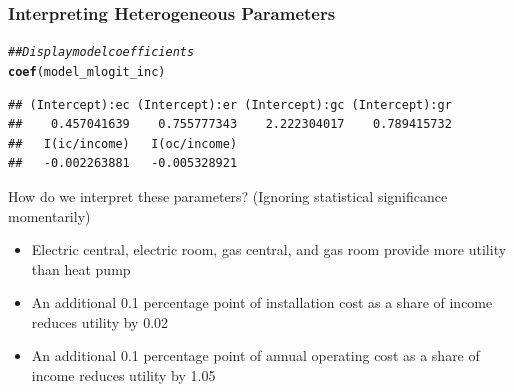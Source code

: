 \documentclass{beamer}\usepackage[]{graphicx}\usepackage[]{xcolor}
\makeatletter
\newcommand{\hlstr}[1]{\textcolor[rgb]{0.192,0.494,0.8}{#1}}%
\newcommand{\hlcom}[1]{\textcolor[rgb]{0.678,0.584,0.686}{\textit{#1}}}%
\newcommand{\hlopt}[1]{\textcolor[rgb]{0,0,0}{#1}}%
\newcommand{\hlstd}[1]{\textcolor[rgb]{0.345,0.345,0.345}{#1}}%
\newcommand{\hlkwc}[1]{\textcolor[rgb]{0.333,0.667,0.333}{#1}}%
\newcommand{\hlkwd}[1]{\textcolor[rgb]{0.737,0.353,0.396}{\textbf{#1}}}%
\newenvironment{kframe}{%
 \def\at@end@of@kframe{}%
 \ifinner\ifhmode%
  \def\at@end@of@kframe{\end{minipage}}%
  \begin{minipage}{\columnwidth}%
 \fi\fi%
 \def\FrameCommand##1{\hskip\@totalleftmargin \hskip-\fboxsep
 \colorbox{shadecolor}{##1}\hskip-\fboxsep
     \hskip-\linewidth \hskip-\@totalleftmargin \hskip\columnwidth}%
 \MakeFramed {\advance\hsize-\width
   \@totalleftmargin\z@ \linewidth\hsize
   \@setminipage}}%
 {\par\unskip\endMakeFramed%
 \at@end@of@kframe}
\newenvironment{knitrout}{}{} %
\makeatother
\begin{document}
\begin{frame}[fragile]\frametitle{Interpreting Heterogeneous Parameters}
\begin{knitrout}\footnotesize
{}\color{fgcolor}\begin{kframe}
\begin{alltt}
\hlcom{## Display model coefficients}
\hlkwd{coef}\hlstd{(model_mlogit_inc)}
\end{alltt}
\begin{verbatim}
## (Intercept):ec (Intercept):er (Intercept):gc (Intercept):gr 
##    0.457041639    0.755777343    2.222304017    0.789415732 
##   I(ic/income)   I(oc/income) 
##   -0.002263881   -0.005328921
\end{verbatim}
\end{kframe}
\end{knitrout}
    \vspace{2ex}
    How do we interpret these parameters? (Ignoring statistical significance momentarily)
    \begin{itemize}
        \item Electric central, electric room, gas central, and gas room provide more utility than heat pump
        \item An additional 0.1 percentage point of installation cost as a share of income reduces utility by 0.02
        \item An additional 0.1 percentage point of annual operating cost as a share of income reduces utility by 1.05
    \end{itemize}
\end{frame}

\end{document}
